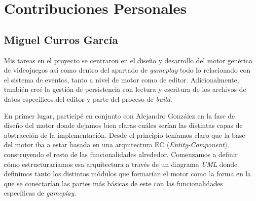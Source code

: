 \chapter*{Contribuciones Personales}
\label{cap:contribucionesPersonales}

\section*{Miguel Curros García}
Mis tareas en el proyecto se centraron en el diseño y desarrollo del motor genérico de videojuegos así como dentro del apartado de \textit{gameplay} todo lo relacionado con el sistema de eventos, tanto a nivel de motor como de editor. Adicionalmente, también creé la gestión de persistencia con lectura y escritura de los archivos de datos específicos del editor y parte del proceso de \textit{build}.

\medskip

En primer lugar, participé en conjunto con Alejandro González en la fase de diseño del motor donde dejamos bien claras cuáles serían las distintas capas de abstracción de la implementación. Desde el principio teníamos claro que la base del motor iba a estar basada en una arquitectura EC (\textit{Entity-Component}), construyendo el resto de las funcionalidades alrededor. Comenzamos a definir cómo estructuraríamos esa arquitectura a través de un diagrama \textit{UML} donde definimos tanto los distintos módulos que formarían el motor como la forma en la que se conectarían las partes más básicas de este con las funcionalidades específicas de \textit{gameplay}.

\medskip
 
